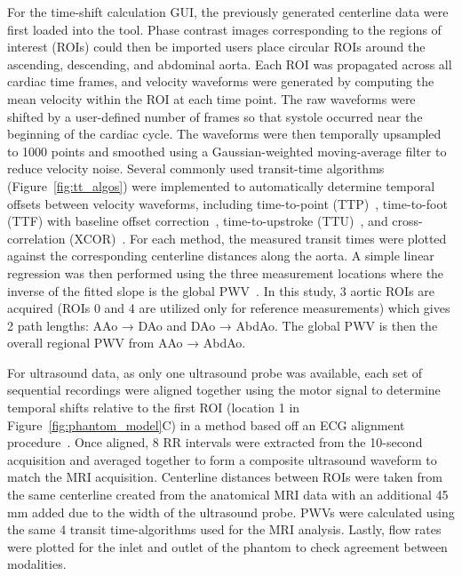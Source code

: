 For the time-shift calculation GUI, the previously generated centerline data were first loaded into the tool. Phase contrast images corresponding to the regions of interest (ROIs) could then be imported users place circular ROIs around the ascending, descending, and abdominal aorta. Each ROI was propagated across all cardiac time frames, and velocity waveforms were generated by computing the mean velocity within the ROI at each time point. The raw waveforms were shifted by a user-defined number of frames so that systole occurred near the beginning of the cardiac cycle. The waveforms were then temporally upsampled to 1000 points and smoothed using a Gaussian-weighted moving-average filter to reduce velocity noise. Several commonly used transit-time algorithms (Figure~\ref{fig:tt_algos}) were implemented to automatically determine temporal offsets between velocity waveforms, including time-to-point (TTP)~\cite{groeninkBiophysicalPropertiesNormalsized2001,doguiMeasurementAorticArch2011}, time-to-foot (TTF) with baseline offset correction~\cite{lundstromPulseWaveVelocity2022}, time-to-upstroke (TTU)~\cite{doguiMeasurementAorticArch2011}, and cross-correlation (XCOR)~\cite{fieldenNewMethodDetermination2008}. For each method, the measured transit times were plotted against the corresponding centerline distances along the aorta.  A simple linear regression was then performed using the three measurement locations where the inverse of the fitted slope is the global PWV~\cite{wentlandReviewMRIbasedMeasurements2014}. In this study, 3 aortic ROIs are acquired (ROIs 0 and 4 are utilized only for reference measurements) which gives 2 path lengths: AAo → DAo and DAo → AbdAo. The global PWV is then the overall regional PWV from AAo → AbdAo.

For ultrasound data, as only one ultrasound probe was available, each set of sequential recordings were aligned together using the motor signal to determine temporal shifts relative to the first ROI (location 1 in Figure~\ref{fig:phantom_model}C) in a method based off an ECG alignment procedure~\cite{ruesinkINVITROVALIDATION4D2018}. Once aligned, 8 RR intervals were extracted from the 10-second acquisition and averaged together to form a composite ultrasound waveform to match the MRI acquisition. Centerline distances between ROIs were taken from the same centerline created from the anatomical MRI data with an additional 45 mm added due to the width of the ultrasound probe. PWVs were calculated using the same 4 transit time-algorithms used for the MRI analysis. Lastly, flow rates were plotted for the inlet and outlet of the phantom to check agreement between modalities.

